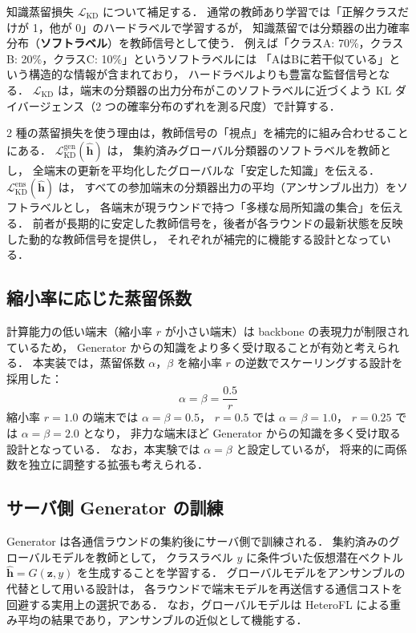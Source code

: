 \documentclass[Japanese,noauthor]{dicomopapers}
\begin{document}
知識蒸留損失 $\mathcal{L}_{\mathrm{KD}}$ について補足する．
通常の教師あり学習では「正解クラスだけが 1，他が 0」のハードラベルで学習するが，
知識蒸留では分類器の出力確率分布（\textbf{ソフトラベル}）を教師信号として使う．
例えば「クラスA: 70\%，クラスB: 20\%，クラスC: 10\%」というソフトラベルには
「AはBに若干似ている」という構造的な情報が含まれており，
ハードラベルよりも豊富な監督信号となる．
$\mathcal{L}_{\mathrm{KD}}$ は，端末の分類器の出力分布がこのソフトラベルに近づくよう
KL ダイバージェンス（2 つの確率分布のずれを測る尺度）で計算する．

2 種の蒸留損失を使う理由は，教師信号の「視点」を補完的に組み合わせることにある．
$\mathcal{L}_{\mathrm{KD}}^{\mathrm{gen}}(\hat{\mathbf{h}})$ は，
集約済みグローバル分類器のソフトラベルを教師とし，
全端末の更新を平均化したグローバルな「安定した知識」を伝える．
$\mathcal{L}_{\mathrm{KD}}^{\mathrm{ens}}(\hat{\mathbf{h}})$ は，
すべての参加端末の分類器出力の平均（アンサンブル出力）をソフトラベルとし，
各端末が現ラウンドで持つ「多様な局所知識の集合」を伝える．
前者が長期的に安定した教師信号を，後者が各ラウンドの最新状態を反映した動的な教師信号を提供し，
それぞれが補完的に機能する設計となっている．

\subsection{縮小率に応じた蒸留係数}

計算能力の低い端末（縮小率 $r$ が小さい端末）は backbone の表現力が制限されているため，
Generator からの知識をより多く受け取ることが有効と考えられる．
本実装では，蒸留係数 $\alpha$，$\beta$ を縮小率 $r$ の逆数でスケーリングする設計を採用した：
\begin{equation}
  \alpha = \beta = \frac{0.5}{r}
  \label{eq:kd_coeff}
\end{equation}
縮小率 $r = 1.0$ の端末では $\alpha = \beta = 0.5$，
$r = 0.5$ では $\alpha = \beta = 1.0$，
$r = 0.25$ では $\alpha = \beta = 2.0$ となり，
非力な端末ほど Generator からの知識を多く受け取る設計となっている．
なお，本実験では $\alpha = \beta$ と設定しているが，
将来的に両係数を独立に調整する拡張も考えられる．

\subsection{サーバ側 Generator の訓練}

Generator は各通信ラウンドの集約後にサーバ側で訓練される．
集約済みのグローバルモデルを教師として，
クラスラベル $y$ に条件づいた仮想潜在ベクトル $\hat{\mathbf{h}} = G(\mathbf{z}, y)$ を生成することを学習する．
グローバルモデルをアンサンブルの代替として用いる設計は，
各ラウンドで端末モデルを再送信する通信コストを回避する実用上の選択である．
なお，グローバルモデルは HeteroFL による重み平均の結果であり，アンサンブルの近似として機能する．
\end{document}
